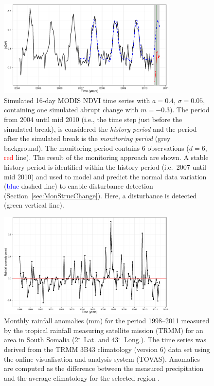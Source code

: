 \documentclass[authoryear,preprint,review,10pt]{elsarticle}
\newcommand{\degree}{\ensuremath{^\circ}}
\begin{document}
 \begin{figure}[htp]
\centering
    \includegraphics[width=0.8\textwidth]{figs/Fig1Sim_Monitoring_ggplot.eps}
  \caption{Simulated 16-day MODIS NDVI time series with $a = 0.4$, $\sigma = 0.05$, containing one simulated abrupt change with $m = -0.3$). The period from 2004 until mid 2010 (i.e., the time step just before the simulated break), is considered the \emph{history period} and the period after the simulated break is the \emph{monitoring period} (grey background). The monitoring period contains 6 observations  ($d = 6$, \textcolor{red} {red} line). The result of the monitoring approach are shown. A stable history period is identified within the history period (i.e.\ 2007 until mid 2010) and used to model and predict the normal data variation (\textcolor{blue} {blue} dashed line) to enable disturbance detection (Section~\ref{sec:MonStrucChange}).  Here, a disturbance is detected (\textcolor{OliveGreen} {green} vertical line).}
  \label{fig:SimMonitor}
\end{figure}

 \begin{figure}[htp]
\centering
    \includegraphics[width=0.8\textwidth]{figs/RainfallAnomaly.eps}
  \caption{Monthly rainfall anomalies (mm) for the period 1998--2011 measured by the tropical rainfall measuring satellite mission (TRMM) for an area in South Somalia (2\degree~Lat. and 43\degree~Long.). The time series was derived from the TRMM 3B43 climatology (version 6) data set using the online visualisation and analysis system (TOVAS). Anomalies are computed as the difference between the measured precipitation and the average climatology for the selected region \citep{Acker:2007vk}.}
  \label{fig:RF}
\end{figure}
\end{document}
